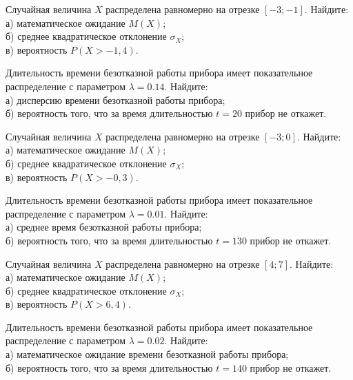 \vfill

\newpage\setcounter{zad}{0}

\z Случайная величина $X$ распределена равномерно на отрезке $[-3; -1]$. Найдите: \\ \quad а) математическое ожидание $M(X)$; \\ \quad б) среднее квадратическое отклонение $\sigma_X$; \\ \quad в) вероятность $P(X>-1{,}4)$.


\vfill

\z Длительность времени безотказной работы прибора имеет показательное распределение с параметром $\lambda = 0.14$. Найдите: \\ \quad а) дисперсию времени безотказной работы прибора; \\ \quad б) вероятность того, что за время длительностью $t = 20$ прибор не откажет.
 

\vfill

\newpage\setcounter{zad}{0}

\z Случайная величина $X$ распределена равномерно на отрезке $[-3; 0]$. Найдите: \\ \quad а) математическое ожидание $M(X)$; \\ \quad б) среднее квадратическое отклонение $\sigma_X$; \\ \quad в) вероятность $P(X>-0{,}3)$.


\vfill

\z Длительность времени безотказной работы прибора имеет показательное распределение с параметром $\lambda = 0.01$. Найдите: \\ \quad а) среднее время безотказной работы прибора; \\ \quad б) вероятность того, что за время длительностью $t = 130$ прибор не откажет.
 

\vfill

\newpage\setcounter{zad}{0}

\z Случайная величина $X$ распределена равномерно на отрезке $[4; 7]$. Найдите: \\ \quad а) математическое ожидание $M(X)$; \\ \quad б) среднее квадратическое отклонение $\sigma_X$; \\ \quad в) вероятность $P(X>6{,}4)$.


\vfill

\z Длительность времени безотказной работы прибора имеет показательное распределение с параметром $\lambda = 0.02$. Найдите: \\ \quad а) математическое ожидание времени безотказной работы прибора; \\ \quad б) вероятность того, что за время длительностью $t = 140$ прибор не откажет.
 

